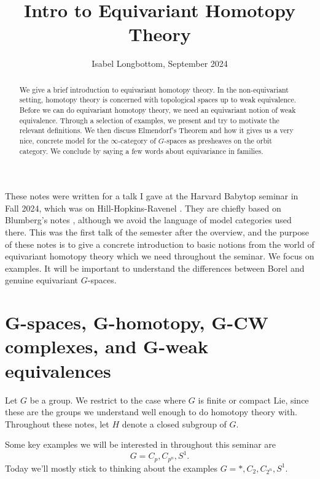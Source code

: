\documentclass{amsart}
\title[Equivariant Homotopy]{Intro to Equivariant Homotopy Theory}
\author[Isabel Longbottom]{Isabel Longbottom, September 2024}
\theoremstyle{definition}
\numberwithin{thm}{section}
\begin{document}
\begin{abstract}
    We give a brief introduction to equivariant homotopy theory. In the non-equivariant setting, homotopy theory is concerned with topological spaces up to weak equivalence. Before we can do equivariant homotopy theory, we need an equivariant notion of weak equivalence. Through a selection of examples, we present and try to motivate the relevant definitions. We then discuss Elmendorf's Theorem and how it gives us a very nice, concrete model for the $\infty$-category of $G$-spaces as presheaves on the orbit category. We conclude by saying a few words about equivariance in families.
\end{abstract}

\maketitle

These notes were written for a talk I gave at the Harvard Babytop seminar in Fall 2024, which was on Hill-Hopkins-Ravenel \cite{hhr}. They are chiefly based on Blumberg's notes \cite{burnside}, although we avoid the language of model categories used there. This was the first talk of the semester after the overview, and the purpose of these notes is to give a concrete introduction to basic notions from the world of equivariant homotopy theory which we need throughout the seminar. We focus on examples. It will be important to understand the differences between Borel and genuine equivariant $G$-spaces. 

\section{G-spaces, G-homotopy, G-CW complexes, and G-weak equivalences}

Let $G$ be a group. We restrict to the case where $G$ is finite or compact Lie, since these are the groups we understand well enough to do homotopy theory with. Throughout these notes, let $H$ denote a closed subgroup of $G$. 

Some key examples we will be interested in throughout this seminar are 
\[G = C_p, C_{p^n}, S^1.\] 
Today we'll mostly stick to thinking about the examples $G = *, C_2, C_{2^n}, S^1$. 
\end{document}
